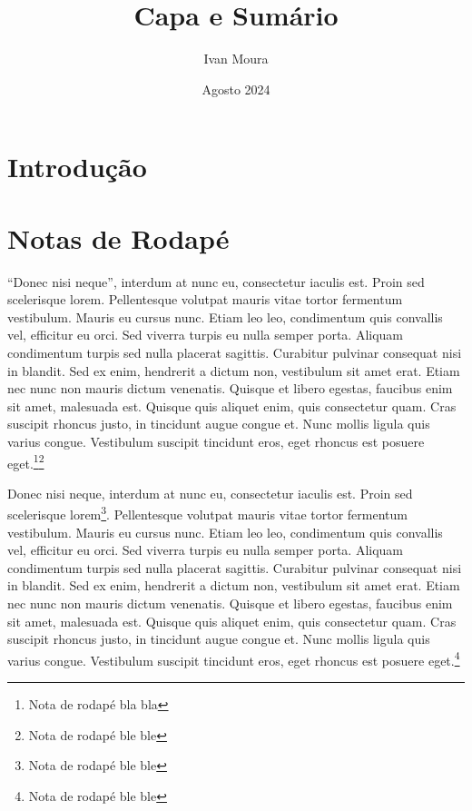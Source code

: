 \documentclass[12pt]{article}
\begin{document}
\title{Capa e Sumário}%
\author{Ivan Moura}%
\date{Agosto 2024}%
\maketitle %
\thispagestyle{empty} %
\newpage

\setcounter{page}{1} %
\tableofcontents %
\newpage

\listoffigures %
\newpage

\setcounter{page}{1} %

\section{Introdução}


\section{Notas de Rodapé}

\enquote{Donec nisi neque}, interdum at nunc eu, consectetur iaculis est. Proin sed scelerisque lorem. Pellentesque volutpat mauris vitae tortor fermentum vestibulum. Mauris eu cursus nunc. Etiam leo leo, condimentum quis convallis vel, efficitur eu orci. Sed viverra turpis eu nulla semper porta. Aliquam condimentum turpis sed nulla placerat sagittis. Curabitur pulvinar consequat nisi in blandit. Sed ex enim, hendrerit a dictum non, vestibulum sit amet erat. Etiam nec nunc non mauris dictum venenatis. Quisque et libero egestas, faucibus enim sit amet, malesuada est. Quisque quis aliquet enim, quis consectetur quam. Cras suscipit rhoncus justo, in tincidunt augue congue et. Nunc mollis ligula quis varius congue. Vestibulum suscipit tincidunt eros, eget rhoncus est posuere eget.\footnote{Nota de rodapé bla bla}\footnote{Nota de rodapé ble ble}

Donec nisi neque, interdum at nunc eu, consectetur iaculis est. Proin sed scelerisque lorem\footnote[999]{Nota de rodapé ble ble}. Pellentesque volutpat mauris vitae tortor fermentum vestibulum. Mauris eu cursus nunc. Etiam leo leo, condimentum quis convallis vel, efficitur eu orci. Sed viverra turpis eu nulla semper porta. Aliquam condimentum turpis sed nulla placerat sagittis. Curabitur pulvinar consequat nisi in blandit. Sed ex enim, hendrerit a dictum non, vestibulum sit amet erat. Etiam nec nunc non mauris dictum venenatis. Quisque et libero egestas, faucibus enim sit amet, malesuada est. Quisque quis aliquet enim, quis consectetur quam. Cras suscipit rhoncus justo, in tincidunt augue congue et. Nunc mollis ligula quis varius congue. Vestibulum suscipit tincidunt eros, eget rhoncus est posuere eget.\footnote{Nota de rodapé ble ble}
\end{document}
